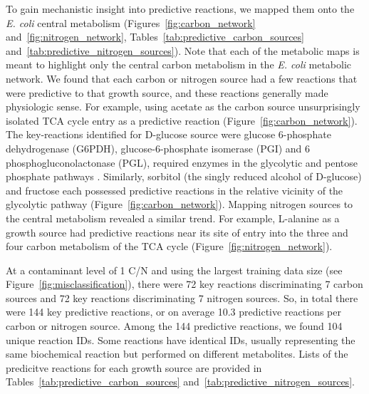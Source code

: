 \documentclass[12pt]{article}
\begin{document}
To gain mechanistic insight into predictive reactions, we mapped them onto the \emph{E. coli} central metabolism (Figures~\ref{fig:carbon_network} and~\ref{fig:nitrogen_network}, Tables~\ref{tab:predictive_carbon_sources} and~\ref{tab:predictive_nitrogen_sources}). Note that each of the metabolic maps is meant to highlight only the central carbon metabolism in the \emph{E. coli} metabolic network. We found that each carbon or nitrogen source had a few reactions that were predictive to that growth source, and these reactions generally made physiologic sense. For example, using acetate as the carbon source unsurprisingly isolated TCA cycle entry as a predictive reaction (Figure~\ref{fig:carbon_network}). The key-reactions identified for D-glucose source were glucose 6-phosphate dehydrogenase (G6PDH), glucose-6-phosphate isomerase (PGI) and 6 phosphogluconolactonase (PGL), required enzymes in the glycolytic and pentose phosphate pathways \cite{KuporFraenkel1972}. Similarly, sorbitol (the singly reduced alcohol of D-glucose) and fructose each possessed predictive reactions in the relative vicinity of the glycolytic pathway (Figure~\ref{fig:carbon_network}). Mapping nitrogen sources to the central metabolism revealed a similar trend. For example, L-alanine as a growth source had predictive reactions near its site of entry into the three and four carbon metabolism of the TCA cycle (Figure~\ref{fig:nitrogen_network}).

At a contaminant level of 1 C/N and using the largest training data size (see Figure~\ref{fig:misclassification}), there were 72 key reactions discriminating 7 carbon sources and 72 key reactions discriminating 7 nitrogen sources. So, in total there were 144 key predictive reactions, or on average 10.3 predictive reactions per carbon or nitrogen source. Among the 144 predictive reactions, we found 104 unique reaction IDs. {\color{red}Some reactions have identical IDs, usually representing the same biochemical reaction but performed on different metabolites.} Lists of the predicitve reactions for each growth source are provided in Tables~\ref{tab:predictive_carbon_sources} and~\ref{tab:predictive_nitrogen_sources}.
\end{document}
